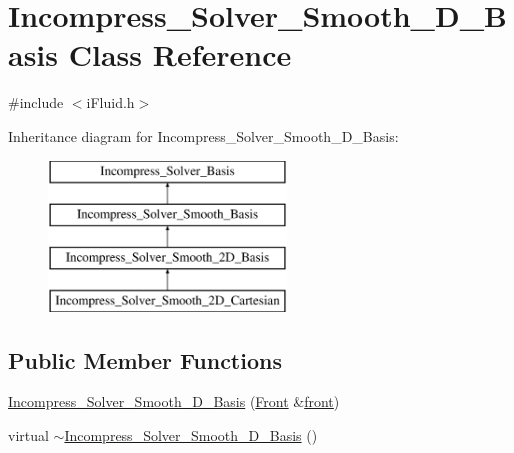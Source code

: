 \hypertarget{class_incompress___solver___smooth__2_d___basis}{}\section{Incompress\+\_\+\+Solver\+\_\+\+Smooth\+\_\+D\+\_\+\+Basis Class Reference}
\label{class_incompress___solver___smooth__2_d___basis}


{\ttfamily \#include $<$i\+Fluid.\+h$>$}

Inheritance diagram for Incompress\+\_\+\+Solver\+\_\+\+Smooth\+\_\+D\+\_\+\+Basis\+:\begin{figure}[H]
\begin{center}
\leavevmode
\includegraphics[height=4.000000cm]{d9/d2b/class_incompress___solver___smooth__2_d___basis}
\end{center}
\end{figure}
\subsection*{Public Member Functions}
\begin{DoxyCompactItemize}
\item 
\hyperlink{class_incompress___solver___smooth__2_d___basis_aad71e6f943955acbbc133abc37e6599f}{Incompress\+\_\+\+Solver\+\_\+\+Smooth\+\_\+D\+\_\+\+Basis} (\hyperlink{fdecs_8h_ac32202b798f848095c489cfd04c4ca5f}{Front} \&\hyperlink{class_incompress___solver___smooth___basis_ab792d371ca86ec9ed21b4c95d1375a0b}{front})
\item 
virtual \hyperlink{class_incompress___solver___smooth__2_d___basis_a23b764c5fe5c19fd9bfc0cc1adc08b2f}{$\sim$\+Incompress\+\_\+\+Solver\+\_\+\+Smooth\+\_\+D\+\_\+\+Basis} ()
\end{DoxyCompactItemize}

